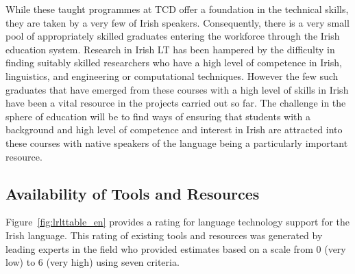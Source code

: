 \begin{multicols}{2}
While these taught programmes at TCD offer a foundation in the technical skills, they are taken by a very few of Irish speakers. Consequently, there is a very small pool of appropriately skilled graduates entering the workforce through the Irish education system. Research in Irish LT has been hampered by the difficulty in finding suitably skilled researchers who have a high level of competence in Irish, linguistics, and engineering or computational techniques. However the few such graduates that have emerged from these courses with a high level of skills in Irish have been a vital resource in the projects carried out so far. The challenge in the sphere of education will be to find ways of ensuring that students with a background and high level of competence and interest in Irish are attracted into these courses with native speakers of the language being a particularly important resource. 



\subsection{Availability of Tools and Resources}

Figure~\ref{fig:lrlttable_en} provides a rating for language technology support for the Irish language. This rating of existing tools and resources was generated by leading experts in the field who provided estimates based on a scale from 0 (very low) to 6 (very high) using seven criteria.


\end{multicols}
